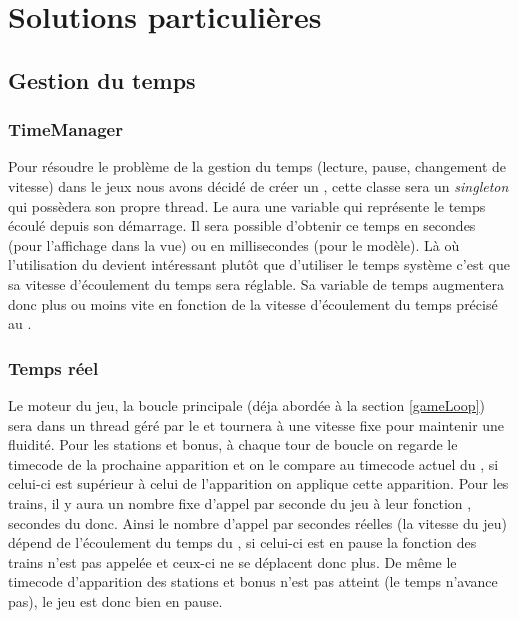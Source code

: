 \documentclass[report, backcover, french, nodocumentinfo]{upmethodology-document}
\begin{document}
	\chapter{Solutions particulières}
		\section{Gestion du temps}
			\subsection{TimeManager}
				Pour résoudre le problème de la gestion du temps (lecture, pause, changement de vitesse) dans le jeux nous avons décidé de créer un , cette classe sera un \textit{singleton} qui possèdera son propre thread. Le  aura une variable qui représente le temps écoulé depuis son démarrage. Il sera possible d'obtenir ce temps en secondes (pour l'affichage dans la vue) ou en millisecondes (pour le modèle). Là où l'utilisation du  devient intéressant plutôt que d'utiliser le temps système c'est que sa vitesse d'écoulement du temps sera réglable. Sa variable de temps augmentera donc plus ou moins vite en fonction de la vitesse d'écoulement du temps précisé au .
			\subsection{Temps réel}
				Le moteur du jeu, la boucle principale (déja abordée à la section \ref{gameLoop}) sera dans un thread géré par le  et tournera à une vitesse fixe pour maintenir une fluidité. Pour les stations et bonus, à chaque tour de boucle on regarde le timecode de la prochaine apparition et on le compare au timecode actuel du , si celui-ci est supérieur à celui de l'apparition on applique cette apparition. Pour les trains, il y aura un nombre fixe d'appel par seconde du jeu à leur fonction , secondes du  donc. Ainsi le nombre d'appel par secondes réelles (la vitesse du jeu) dépend de l'écoulement du temps du , si celui-ci est en pause la fonction  des trains n'est pas appelée et ceux-ci ne se déplacent donc plus. De même le timecode d'apparition des stations et bonus n'est pas atteint (le temps n'avance pas), le jeu est donc bien en pause.
\end{document}
